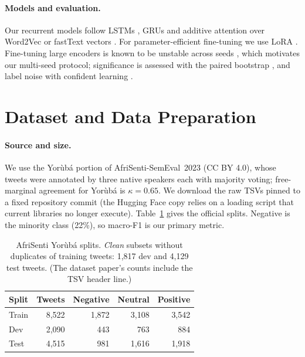 \documentclass[11pt]{article}
\begin{document}
\paragraph{Models and evaluation.} Our recurrent models follow LSTMs \citep{hochreiter-schmidhuber-1997-lstm}, GRUs \citep{cho-etal-2014-learning} and additive attention \citep{bahdanau-etal-2015-neural} over Word2Vec \citep{mikolov-etal-2013-efficient} or fastText vectors \citep{bojanowski-etal-2017-enriching,grave-etal-2018-learning}. For parameter-efficient fine-tuning we use LoRA \citep{hu-etal-2022-lora}. Fine-tuning large encoders is known to be unstable across seeds \citep{mosbach-etal-2021-stability}, which motivates our multi-seed protocol; significance is assessed with the paired bootstrap \citep{koehn-2004-statistical,efron-tibshirani-1993-bootstrap}, and label noise with confident learning \citep{northcutt-etal-2021-confident}.

\section{Dataset and Data Preparation}\label{sec:data}
\paragraph{Source and size.} We use the Yorùbá portion of AfriSenti-SemEval~2023 \citep{muhammad-etal-2023-afrisenti,afrisenti-github} (CC BY 4.0), whose tweets were annotated by three native speakers each with majority voting; free-marginal agreement for Yorùbá is $\kappa = 0.65$. We download the raw TSVs pinned to a fixed repository commit (the Hugging Face copy relies on a loading script that current libraries no longer execute). Table~\ref{tab:data} gives the official splits. Negative is the minority class (22\%), so macro-F1 is our primary metric.

\begin{table}[t]
\centering\small
\begin{tabular}{lrrrr}
\toprule
Split & Tweets & Negative & Neutral & Positive \\
\midrule
Train & 8,522 & 1,872 & 3,108 & 3,542 \\
Dev   & 2,090 &   443 &   763 &   884 \\
Test  & 4,515 &   981 & 1,616 & 1,918 \\
\bottomrule
\end{tabular}
\caption{AfriSenti Yorùbá splits. \emph{Clean} subsets without duplicates of training tweets: 1,817 dev and 4,129 test tweets. (The dataset paper's counts include the TSV header line.)}
\label{tab:data}
\end{table}
\end{document}
